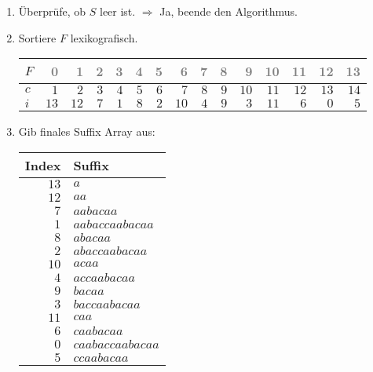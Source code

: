 \begin{enumerate}
\item 
Überprüfe, ob $S$ leer ist.
$\Rightarrow$ Ja, beende den Algorithmus.
\item 
Sortiere $F$ lexikografisch.
\begin{center}
\small\begin{tabular}{lrrrrrrrrrrrrrr}
    \toprule 
    $F$ & \textcolor{gray}{0} & \textcolor{gray}{1} & \textcolor{gray}{2} & \textcolor{gray}{3} & \textcolor{gray}{4} & \textcolor{gray}{5} & \textcolor{gray}{6} & \textcolor{gray}{7} & \textcolor{gray}{8} & \textcolor{gray}{9} & \textcolor{gray}{10} & \textcolor{gray}{11} & \textcolor{gray}{12} & \textcolor{gray}{13}\\
    \midrule 
    $c$ & $1$ & $2$ & $3$ & $4$ & $5$ & $6$ & $7$ & $8$ & $9$ & $10$ & $11$ & $12$ & $13$ & $14$ \\
    $i$ & $13$ & $12$ & $7$ & $1$ & $8$ & $2$ & $10$ & $4$ & $9$ & $3$ & $11$ & $6$ & $0$ & $5$ \\
    \bottomrule 
\end{tabular}
\end{center}

\item 
Gib finales Suffix Array aus:
\begin{center}
\small\begin{tabular}{rl}
\toprule 
 Index & Suffix \\
\midrule 
  $13$ & $a$ \\
  $12$ & $aa$ \\
  $ 7$ & $aabacaa$ \\
  $ 1$ & $aabaccaabacaa$ \\
  $ 8$ & $abacaa$ \\
  $ 2$ & $abaccaabacaa$ \\
  $10$ & $acaa$ \\
  $ 4$ & $accaabacaa$ \\
  $ 9$ & $bacaa$ \\
  $ 3$ & $baccaabacaa$ \\
  $11$ & $caa$ \\
  $ 6$ & $caabacaa$ \\
  $ 0$ & $caabaccaabacaa$ \\
  $ 5$ & $ccaabacaa$ \\
\bottomrule 
\end{tabular}\\
\end{center}
\end{enumerate}
